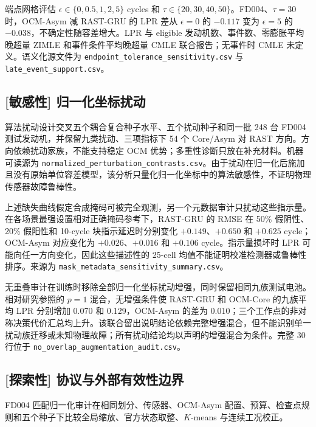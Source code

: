 


端点网格评估 $\epsilon\in\{0,0.5,1,2,5\}$ cycles 和 $\tau\in\{20,30,40,50\}$。FD004、$\tau=30$ 时，OCM-Asym 减 RAST-GRU 的 LPR 差从 $\epsilon=0$ 的 $-0.117$ 变为 $\epsilon=5$ 的 $-0.038$，不确定性随容差增大。LPR 与 eligible 发动机数、事件数、零膨胀平均晚超量 ZIMLE 和事件条件平均晚超量 CMLE 联合报告；无事件时 CMLE 未定义。语义化源文件为 \texttt{endpoint\_tolerance\_sensitivity.csv} 与 \texttt{late\_event\_support.csv}。

\subsection{[敏感性] 归一化坐标扰动}

算法扰动设计交叉五个耦合复合种子水平、五个扰动种子和同一批 248 台 FD004 测试发动机，并保留九类扰动、三项指标下 54 个 Core/Asym 对 RAST 方向。方向依赖扰动家族，不能支持稳定 OCM 优势；多重性诊断只放在补充材料。机器可读源为 \texttt{normalized\_perturbation\_contrasts.csv}。由于扰动在归一化后施加且没有原始单位容差模型，该分析只量化归一化坐标中的算法敏感性，不证明物理传感器故障鲁棒性。

上述缺失曲线假定合成掩码可被完全观测，另一个元数据审计只扰动这些指示量。在各场景最强设置相对正确掩码参考下，RAST-GRU 的 RMSE 在 50\% 假阴性、20\% 假阳性和 10-cycle 块指示延迟时分别变化 $+0.149$、$+0.650$ 和 $+0.625$ cycle；OCM-Asym 对应变化为 $+0.026$、$+0.016$ 和 $+0.106$ cycle。指示量损坏时 LPR 可能向任一方向变化，因此这些描述性的 25-cell 均值不能证明校准检测器或鲁棒性排序。来源为 \texttt{mask\_metadata\_sensitivity\_summary.csv}。

无重叠审计在训练时移除全部归一化坐标扰动增强，同时保留相同九族测试电池。相对研究参照的 $p=1$ 混合，无增强条件使 RAST-GRU 和 OCM-Core 的九族平均 LPR 分别增加 0.070 和 0.129，OCM-Asym 的差为 0.010；三个工作点的非对称决策代价汇总均上升。该联合留出说明结论依赖完整增强混合，但不能识别单一扰动族迁移或未知物理故障；所有扰动结论均以声明的增强混合为条件。完整 30 行位于 \texttt{no\_overlap\_augmentation\_audit.csv}。

\subsection{[探索性] 协议与外部有效性边界}

FD004 匹配归一化审计在相同划分、传感器、OCM-Asym 配置、预算、检查点规则和五个种子下比较全局缩放、官方状态取整、$K$-means 与连续工况校正。

